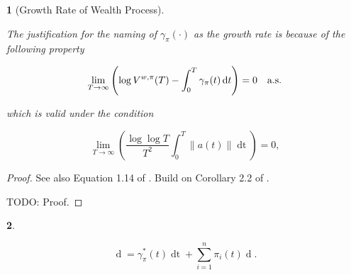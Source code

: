 \documentclass[british]{amsart} \usepackage{lmodern}
\numberwithin{equation}{section} \numberwithin{figure}{section}
\theoremstyle{plain} \newtheorem{thm}{\protect\theoremname}[section]
\theoremstyle{definition} \newtheorem{defn}[thm]{\protect\definitionname}
\theoremstyle{plain} \newtheorem{assumption}[thm]{\protect\assumptionname}
\theoremstyle{plain} \newtheorem{lem}[thm]{\protect\lemmaname}
\theoremstyle{plain} \newtheorem{prop}[thm]{\protect\propositionname}
\theoremstyle{remark} \newtheorem{rem}[thm]{\protect\remarkname}
\theoremstyle{plain} \newtheorem{cor}[thm]{\protect\corollaryname}
\renewcommand{\d}[1]{\mathop{\mathrm{d}{#1}}}
\newcommand{\norm}[1]{\left\lVert#1\right\rVert}
\begin{document}
\begin{prop} [Growth Rate of Wealth Process]
  \label{thm:wealthgrowthrate}

  The justification for the naming of $\gamma_{\pi}(\cdot)$ as the \textit{growth rate} is because of the following property

  \begin{equation*}
    \lim_{T \to \infty} 
      \left( 
      \log{V^{w,\pi}(T)} - \int_{0}^{T} \gamma_{\pi}(t)\d{t} 
      \right) = 0
    \quad \almostsurely
  \end{equation*}

  which is valid under the condition

  \begin{equation*}
    \lim_{T \to \infty}
      \left(
        \frac{\log \log T}{T^2} \int_{0}^{T} \norm{ a(t) } \d{t}
      \right) = 0,
  \end{equation*}

\end{prop}

\begin{proof}
  See also Equation 1.14 of \cite{fernholz2009}.
  Build on Corollary 2.2 of \cite{fernholz1999pgf}.

  TODO: Proof.
\end{proof}

\begin{prop}
  \label{prop:dlogV}

  \begin{equation}
      \d{\log V^{\pi}(t)} = \gamma_{\pi}^{*}(t)\d{t} + \sum_{i=1}^{n} \pi_{i}(t) \d{\log{X_{i}(t)}}.
  \end{equation}

\end{prop}
\end{document}
